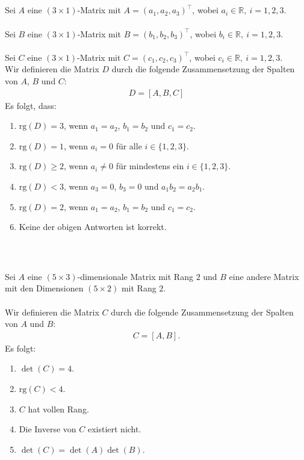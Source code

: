\subsection*{}
Sei $ A $ eine $ (3 \times 1) $-Matrix mit $A = (a_1, a_2, a_3)^\top$, wobei $ a_i \in \mathbb{R}, \ i = 1,2,3$.\\
\\
Sei $ B $ eine $ (3 \times 1) $-Matrix mit $B = (b_1, b_2, b_3)^\top$, wobei $ b_i \in \mathbb{R}, \ i = 1,2,3$.\\
\\
Sei $ C $ eine $ (3 \times 1) $-Matrix mit $C = (c_1, c_2, c_3)^\top$, wobei $ c_i \in \mathbb{R}, \ i = 1,2,3$.\\

Wir definieren die Matrix $D$ durch die folgende Zusammensetzung der Spalten von $A$, $B$ und $C$:
\begin{align*}
	D = [A,B,C]
\end{align*}
Es folgt, dass:
\renewcommand{\labelenumi}{(\alph{enumi})}
\begin{enumerate}
	\item 
	$ \mathrm{rg}(D) = 3 $, wenn $a_1 = a_2$, $b_1 = b_2$ und $c_1 = c_2$.
	\item
	$ \mathrm{rg}(D) = 1 $, wenn $ a_i = 0 $ für alle $ i \in \{1,2,3\} $.
	\item
	$ \mathrm{rg}(D) \geq  2 $, wenn $ a_i \neq 0 $ für mindestens ein $ i \in \{1,2,3\} $.
	\item
	$ \mathrm{rg}(D) < 3 $, wenn $a_3 = 0$, $b_3 = 0$ und $a_1 b_2 = a_2 b_1$. 
	\item
	$ \mathrm{rg}(D) = 2 $, wenn $a_1 = a_2$, $b_1 = b_2$ und $c_1 = c_2$.
	\item 
	Keine der obigen Antworten ist korrekt.
\end{enumerate}
\ \\
\subsection*{}
Sei $ A $ eine $ (5 \times 3) $-dimensionale Matrix mit Rang $ 2 $ und $ B $ eine andere Matrix mit den Dimensionen $ (5 \times 2) $ mit Rang $ 2 $.\\
\\
Wir definieren die Matrix $ C $ durch die folgende Zusammensetzung der Spalten von $ A $ und $ B $:
\begin{align*}
	C = [A, B].
\end{align*}
Es folgt:
\renewcommand{\labelenumi}{(\alph{enumi})}
\begin{enumerate}
	\item 
	$ \det(C) = 4$.
	\item
	$ \mathrm{rg}(C) < 4 $.
	\item
	$ C$ hat vollen Rang.
	\item
	Die Inverse von $C$ existiert nicht.
	\item
	$\det(C) = \det(A) \det(B)$.
\end{enumerate}
\ \\
